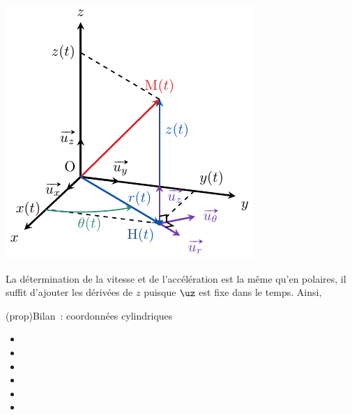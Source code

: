 \documentclass[../../main/main.tex]{subfiles}
\begin{document}
\begin{tcb*}[sidebyside, righthand ratio=.35]
\begin{center}
{			\includegraphics[width=\linewidth]{pos_cyl_prof}
		}
		\vspace{-15pt}
	\end{center}
\end{tcb*}

La détermination de la vitesse et de l'accélération est la même qu'en polaires,
il suffit d'ajouter les dérivées de $z$ puisque $\uz$ est fixe dans le temps.
Ainsi,

\begin{tcb*}(prop){Bilan~: coordonnées cylindriques}
	\begin{itemize}[itemsep=-10pt]
		\item {}
		      {}
		\item {}
		      {\psw{$(\ur,\ut,\uz)$}}
		\item {}
		      {}
		\item {}
		      {}
		\item {}
		      {}
		\item {}
		      {}
	\end{itemize}
\end{tcb*}
\end{document}
